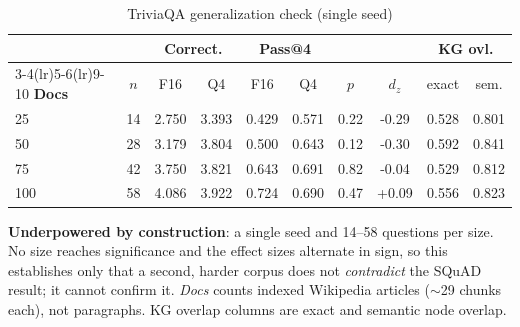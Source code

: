 \begin{table}[t]
\centering
\caption{TriviaQA generalization check (single seed)}
\label{tab:trivia}
\footnotesize
\setlength{\tabcolsep}{3pt}
\begin{tabular}{lccccccccc}
\toprule
& & \multicolumn{2}{c}{\textbf{Correct.}} & \multicolumn{2}{c}{\textbf{Pass@4}} & & & \multicolumn{2}{c}{\textbf{KG ovl.}} \\
\cmidrule(lr){3-4}\cmidrule(lr){5-6}\cmidrule(lr){9-10}
\textbf{Docs} & $n$ & F16 & Q4 & F16 & Q4 & $p$ & $d_z$ & exact & sem. \\
\midrule
25 & 14 & 2.750 & 3.393 & 0.429 & 0.571 & 0.22 & -0.29 & 0.528 & 0.801 \\
\rowcolor{gray!10}50 & 28 & 3.179 & 3.804 & 0.500 & 0.643 & 0.12 & -0.30 & 0.592 & 0.841 \\
75 & 42 & 3.750 & 3.821 & 0.643 & 0.691 & 0.82 & -0.04 & 0.529 & 0.812 \\
\rowcolor{gray!10}100 & 58 & 4.086 & 3.922 & 0.724 & 0.690 & 0.47 & +0.09 & 0.556 & 0.823 \\
\bottomrule
\end{tabular}
\parbox[t]{0.485\textwidth}{\vspace{0.1cm}\textbf{Underpowered by construction}: a single seed and 14--58 questions per size. No size reaches significance and the effect sizes alternate in sign, so this establishes only that a second, harder corpus does not \emph{contradict} the SQuAD result; it cannot confirm it. \emph{Docs} counts indexed Wikipedia articles ($\sim$29 chunks each), not paragraphs. KG overlap columns are exact and semantic node overlap.}
\end{table}
